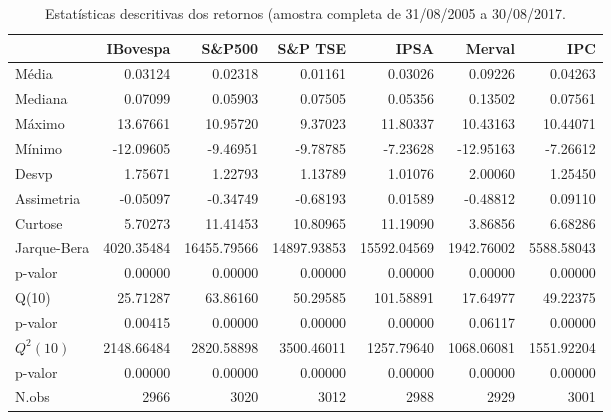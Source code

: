 \begin{table}[ht]
\centering
\caption{Estatísticas descritivas dos retornos 
               (amostra completa de 31/08/2005 a 30/08/2017.} 
\label{tab:descritivas}
\begin{tabular}{lrrrrrr}
  \hline
 & IBovespa & S\&P500 & S\&P TSE & IPSA & Merval & IPC \\ 
  \hline
Média & 0.03124 & 0.02318 & 0.01161 & 0.03026 & 0.09226 & 0.04263 \\ 
  Mediana & 0.07099 & 0.05903 & 0.07505 & 0.05356 & 0.13502 & 0.07561 \\ 
  Máximo & 13.67661 & 10.95720 & 9.37023 & 11.80337 & 10.43163 & 10.44071 \\ 
  Mínimo & -12.09605 & -9.46951 & -9.78785 & -7.23628 & -12.95163 & -7.26612 \\ 
  Desvp & 1.75671 & 1.22793 & 1.13789 & 1.01076 & 2.00060 & 1.25450 \\ 
  Assimetria & -0.05097 & -0.34749 & -0.68193 & 0.01589 & -0.48812 & 0.09110 \\ 
  Curtose & 5.70273 & 11.41453 & 10.80965 & 11.19090 & 3.86856 & 6.68286 \\ 
  Jarque-Bera & 4020.35484 & 16455.79566 & 14897.93853 & 15592.04569 & 1942.76002 & 5588.58043 \\ 
  p-valor & 0.00000 & 0.00000 & 0.00000 & 0.00000 & 0.00000 & 0.00000 \\ 
  Q(10) & 25.71287 & 63.86160 & 50.29585 & 101.58891 & 17.64977 & 49.22375 \\ 
  p-valor & 0.00415 & 0.00000 & 0.00000 & 0.00000 & 0.06117 & 0.00000 \\ 
  $Q^2(10)$ & 2148.66484 & 2820.58898 & 3500.46011 & 1257.79640 & 1068.06081 & 1551.92204 \\ 
  p-valor & 0.00000 & 0.00000 & 0.00000 & 0.00000 & 0.00000 & 0.00000 \\ 
  N.obs & 2966 & 3020 & 3012 & 2988 & 2929 & 3001 \\ 
   \hline
\end{tabular}
\end{table}
